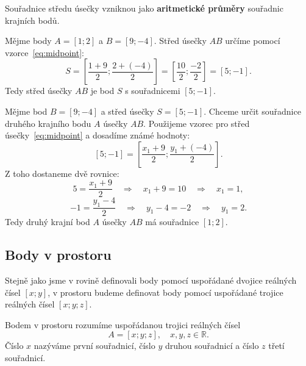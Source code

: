 \begin{remark}
    Souřadnice středu úsečky vzniknou jako \textbf{aritmetické průměry} souřadnic krajních bodů.
\end{remark}

\begin{example}
    Mějme body $A = [1;2]$ a $B = [9;-4]$.
    Střed úsečky $AB$ určíme pomocí vzorce~\eqref{eq:midpoint}:
    \[
    S = \left[\frac{1 + 9}{2}; \frac{2 + (-4)}{2}\right] = \left[\frac{10}{2}; \frac{-2}{2}\right] = \left[5; -1\right].
    \]
    Tedy střed úsečky $AB$ je bod $S$ s souřadnicemi $[5; -1]$.
\end{example}

\begin{example}
    Mějme bod $B = [9;-4]$ a střed úsečky $S = [5; -1]$.
    Chceme určit souřadnice druhého krajního bodu $A$ úsečky $AB$.
    Použijeme vzorec pro střed úsečky~\eqref{eq:midpoint} a dosadíme známé hodnoty:
    \[
    [5; -1] = \left[\frac{x_1 + 9}{2}; \frac{y_1 + (-4)}{2}\right].
    \]
    Z toho dostaneme dvě rovnice:
    \[
    5 = \frac{x_1 + 9}{2} \quad \Rightarrow \quad x_1 + 9 = 10 \quad \Rightarrow \quad x_1 = 1,
    \]
    \[
    -1 = \frac{y_1 - 4}{2} \quad \Rightarrow \quad y_1 - 4 = -2 \quad \Rightarrow \quad y_1 = 2.
    \]
    Tedy druhý krajní bod $A$ úsečky $AB$ má souřadnice $[1; 2]$.
\end{example}


\subsection{Body v prostoru}\label{subsec:Points_in_space}

Stejně jako jsme v rovině definovali body pomocí uspořádané dvojice reálných čísel $[x;y]$, v prostoru budeme definovat body pomocí uspořádané trojice reálných čísel $[x;y;z]$.


\begin{definition}\label{def:bod_v_prostoru}
    Bodem v prostoru rozumíme uspořádanou trojici reálných čísel
    \[
    A = [x;y;z], \quad x,y,z \in \mathbb{R}.
    \]
    Číslo $x$ nazýváme první souřadnicí, číslo $y$ druhou souřadnicí a číslo $z$ třetí souřadnicí.
\end{definition}

